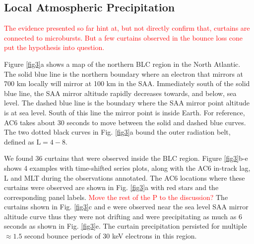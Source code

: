 \documentclass[draft]{agujournal2019}
\begin{document}
\subsection{Local Atmospheric Precipitation}
\textcolor{red}{The evidence presented so far hint at, but not directly confirm that, curtains are connected to microbursts. But a few curtains observed in the bounce loss cone put the hypothesis into question.}

Figure \ref{fig3}a shows a map of the northern BLC region in the North Atlantic. The solid blue line is the northern boundary where an electron that mirrors at 700 km locally will mirror at 100 km in the SAA. Immediately south of the solid blue line, the SAA mirror altitude rapidly decreases towards, and below, sea level. The dashed blue line is the boundary where the SAA mirror point altitude is at sea level. South of this line the mirror point is inside Earth. For reference, AC6 takes about 30 seconds to move between the solid and dashed blue curves. The two dotted black curves in Fig. \ref{fig3}a bound the outer radiation belt, defined as $\mathrm{L}=4-8$.

We found 36 curtains that were observed inside the BLC region. Figure \ref{fig3}b-e shows 4 examples with time-shifted series plots, along with the AC6 in-track lag, L and MLT during the observations annotated. The AC6 locations where these curtains were observed are shown in Fig. \ref{fig3}a with red stars and the corresponding panel labels. \textcolor{red}{Move the rest of the P to the discussion?} The curtains shown in Fig. \ref{fig3}c and e were observed near the sea level SAA mirror altitude curve thus they were not drifting and were precipitating as much as 6 seconds as shown in Fig. \ref{fig3}e. The curtain precipitation persisted for multiple $\approx 1.5$ second bounce periods of 30 keV electrons in this region.
\end{document}
